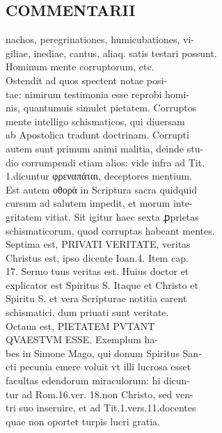 \documentclass{article}
\begin{document}
\begin{pages}
\section*{COMMENTARII \\
                }nachos, peregrinationes, humicubationes, vi- \\
                giliae, inediae, cantus, aliaq. satis testari possunt. \\
                Hominum mente corruptorum, etc. \\
                Ostendit ad quos spectent notae posi- \\
                tae: nimirum testimonia esse reprobi homi- \\
                nis, quantumuis simulet pietatem. Corruptos \\
                mente intelligo schismaticos, qui diuersam \\
                ab Apostolica tradunt doctrinam. Corrupti \\
                autem sunt primum animi malitia, deinde stu- \\
                dio corrumpendi etiam alios: vide infra ad Tit. \\
                1.dicuntur φρεναπάται, deceptores mentium. \\
                Est autem οθορὰ in Scriptura sacra quidquid \\
                cursum ad salutem impedit, et morum inte- \\
                gritatem vitiat. Sit igitur haec sexta ꝓprietas \\
                schismaticorum, quod corruptas habeant mentes. \\
                Septima est, PRIVATI VERITATE, veritas \\
                Christus est, ipso dicente Ioan.4. Item cap. \\
                17. Sermo tuus veritas est. Huius doctor et \\
                explicator est Spiritus S. Itaque et Christo et \\
                Spiritu S. et vera Scripturae notitia carent \\
                schismatici, dum priuati sunt veritate. \\
                Octaua est, PIETATEM PVTANT \\
                QVAESTVM ESSE. Exemplum ha- \\
                bes in Simone Mago, qui donum Spiritus San- \\
                cti pecunia emere voluit vt illi lucrosa esset \\
                facultas edendorum miraculorum: hi dicun- \\
                tur ad Rom.16.ver. 18.non Christo, sed ven- \\
                tri suo inseruire, et ad Tit.1.vers.11.docentes \\
                quae non oportet turpis lucri gratia. \\
                

\end{pages}
\end{document}
